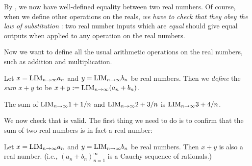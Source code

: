\begin{note}
By , we now have well-defined equality between two real numbers.
Of course, when we define other operations on the reals, \emph{we have to check that they obey the law of substitution} :
two real number inputs which are \emph{equal} should give equal outputs when applied to any operation on the real numbers.

Now we want to define all the usual arithmetic operations on the real numbers, such as addition and multiplication. 
\end{note}

\begin{definition}  \label{def 5.3.4} 
Let \(x = \text{LIM}_{n \to \infty} a_n\) and \(y = \text{LIM}_{n \to \infty} b_n\) be real numbers.
Then we \emph{define} the \emph{sum} \(x + y\) to be \(x + y := \text{LIM}_{n \to \infty} (a_n + b_n)\).
\end{definition}

\begin{example} \label{example 5.3.5}
The sum of \(\text{LIM}_{n \to \infty} 1 + 1/n\) and \(\text{LIM}_{n \to \infty} 2 + 3 / n\) is \(\text{LIM}_{n \to \infty} 3 + 4/n\).
\end{example}

We now check that  is valid.
The first thing we need to do is to confirm that the sum of two real numbers is in fact a real number:

\begin{lemma}  \label{lem 5.3.6}
Let \(x = \text{LIM}_{n \to \infty} a_n\) and \(y = \text{LIM}_{n \to \infty} b_n\) be real numbers.
Then \(x + y\) is also a real number. (i.e., \((a_n + b_n)_{n = 1}^{\infty}\) is a Cauchy sequence of rationals.)
\end{lemma}


